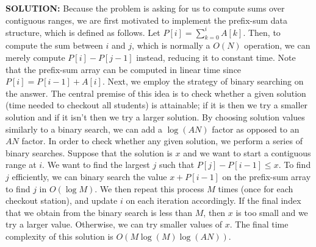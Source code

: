 \textbf{SOLUTION:}
\blank
Because the problem is asking for us to compute sums over contiguous ranges, we are first motivated to implement the prefix-sum data structure, which is defined as follows. Let $P[i] = \sum_{k=0}^{i} A[k]$. Then, to compute the sum between $i$ and $j$, which is normally a $O(N)$ operation, we can merely compute $P[i] - P[j-1]$ instead, reducing it to constant time. Note that the prefix-sum array can be computed in linear time since $P[i] = P[i-1] + A[i]$. 
\blank
Next, we employ the strategy of binary searching on the answer. The central premise of this idea is to check whether a given solution (time needed to checkout all students) is attainable; if it is then we try a smaller solution and if it isn't then we try a larger solution. By choosing solution values similarly to a binary search, we can add a $\log (AN)$ factor as opposed to an $AN$ factor. 
\blank
In order to check whether any given solution, we perform a series of binary searches. Suppose that the solution is $x$ and we want to start a contiguous range at $i$. We want to find the largest $j$ such that $P[j] - P[i-1] \leq x$. To find $j$ efficiently, we can binary search the value $x + P[i-1]$ on the prefix-sum array to find $j$ in $O(\log M)$. We then repeat this process $M$ times (once for each checkout station), and update $i$ on each iteration accordingly. 
\blank
If the final index that we obtain from the binary search is less than $M$, then $x$ is too small and we try a larger value. Otherwise, we can try smaller values of $x$. 
\blank
The final time complexity of this solution is $O(M \log(M) \log(AN))$.